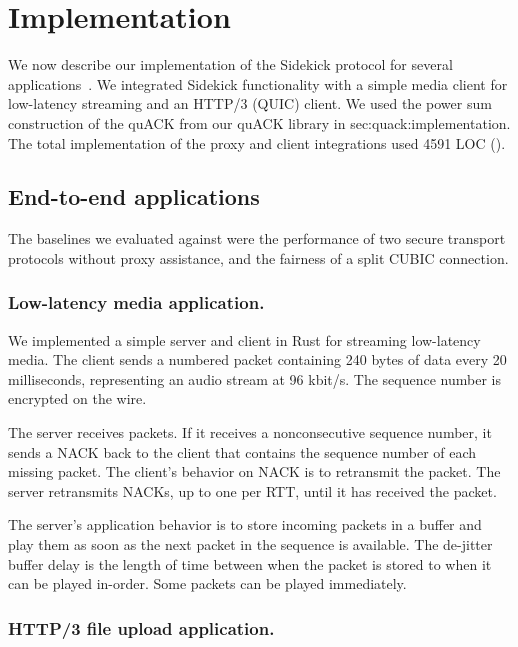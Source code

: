 \section{Implementation}
\label{sec:sidekick:implementation}



We now describe our implementation of the Sidekick protocol for several
applications~\cite{sidekick-github}.
We integrated Sidekick functionality with a simple media client
for low-latency streaming and an HTTP/3 (QUIC) client. We used the power sum
construction of the quACK from our quACK library in \Cref
{sec:quack:implementation}. The total implementation of the proxy and client
integrations used 4591 LOC ().

\subsection{End-to-end applications}
\label{sec:sidekick:implementation:applications}

The baselines we evaluated against were the performance of two secure transport
protocols without proxy assistance, and the fairness of a split CUBIC
connection.

\subsubsection{Low-latency media application.}
We implemented a simple server and client in Rust for streaming low-latency
media. The client sends a numbered packet containing 240 bytes of data every
20 milliseconds, representing an audio stream at 96 kbit/s.
The sequence number is encrypted on the wire.

The server receives packets. If it receives a nonconsecutive sequence number,
it sends a NACK back to the client that contains the sequence number of each
missing packet. The client's behavior on NACK is to retransmit the packet. The
server retransmits NACKs, up to one per RTT, until it has received the packet.

The server's application behavior is to store incoming packets in a buffer
and play them as soon as the next packet in the sequence is available. The
de-jitter buffer delay is the length of time between when the packet is stored
to when it can be played in-order. Some packets can be played immediately.

\subsubsection{HTTP/3 file upload application.}


